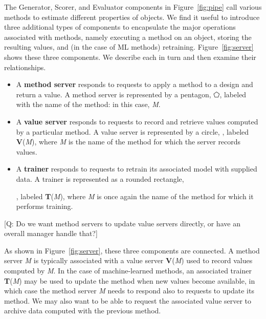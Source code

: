 \documentclass[10pt]{article}
\newcommand\q[1]{{\color{blue}[Q: #1]}}
\begin{document}
The Generator, Scorer, and Evaluator components in Figure~\ref{fig:pipe} call various methods to estimate different properties of objects.
We find it useful to introduce three additional types of components to encapsulate the major operations associated with methods,
namely executing a method on an object, storing the resulting values, and (in the case of ML methods) retraining.  
Figure~\ref{fig:server} shows these three components. 
We describe each in turn and then examine their relationships.



\begin{itemize}
\itemsep-0.3em 
\item
A \textbf{method server} responds to requests to apply a method to a design and return a value. 
A method server is represented by a pentagon, $\pentagon$, labeled with the name of the method: in this case, \emph{M}. 
\item
A \textbf{value server} responds to requests to record and retrieve values computed by a particular method.
A value server is represented by a circle, \textbigcircle,
labeled \textbf{V}(\emph{M}), where \emph{M} is the name of the method for which the server records values.
\item
A \textbf{trainer} responds to requests to retrain its associated model with supplied data.
A trainer is represented as a rounded rectangle, , labeled \textbf{T}(\emph{M}),
where \emph{M} is once again the name of the method for which it performs training.
\end{itemize}

\q{Do we want method servers to update value servers directly, or have an overall manager handle that?}



As shown in Figure~\ref{fig:server}, these three components are connected. 
A method server \emph{M} is typically associated with a value server \textbf{V}(\emph{M}) used to record values computed by \emph{M}.
In the case of machine-learned methods, an associated trainer \textbf{T}(\emph{M}) may be used to update the method when new values become available,
in which case the method server \emph{M} needs to respond also to requests to update its method.
We may also want to be able to request the associated value server to archive data computed with the previous method.
\end{document}
